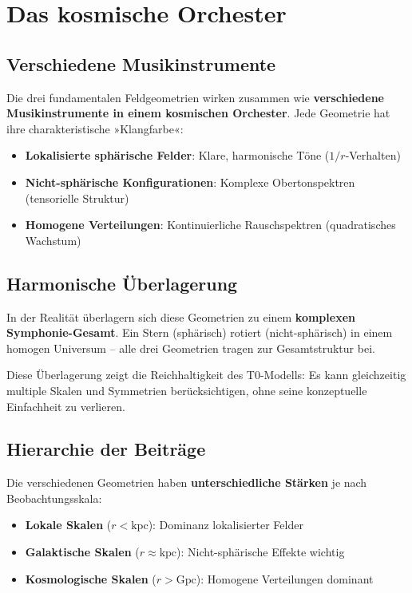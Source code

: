 \documentclass[12pt,a4paper]{report}
\begin{document}
	\section{Das kosmische Orchester}
	
	\subsection{Verschiedene Musikinstrumente}
	
	Die drei fundamentalen Feldgeometrien wirken zusammen wie \textbf{verschiedene Musikinstrumente in einem kosmischen Orchester}. Jede Geometrie hat ihre charakteristische »Klangfarbe«:
	
	\begin{itemize}
		\item \textbf{Lokalisierte sphärische Felder}: Klare, harmonische Töne ($1/r$-Verhalten)
		\item \textbf{Nicht-sphärische Konfigurationen}: Komplexe Obertonspektren (tensorielle Struktur)
		\item \textbf{Homogene Verteilungen}: Kontinuierliche Rauschspektren (quadratisches Wachstum)
	\end{itemize}
	
	\subsection{Harmonische Überlagerung}
	
	In der Realität überlagern sich diese Geometrien zu einem \textbf{komplexen Symphonie-Gesamt}. Ein Stern (sphärisch) rotiert (nicht-sphärisch) in einem homogen Universum -- alle drei Geometrien tragen zur Gesamtstruktur bei.
	
	Diese Überlagerung zeigt die Reichhaltigkeit des T0-Modells: Es kann gleichzeitig multiple Skalen und Symmetrien berücksichtigen, ohne seine konzeptuelle Einfachheit zu verlieren.
	
	\subsection{Hierarchie der Beiträge}
	
	Die verschiedenen Geometrien haben \textbf{unterschiedliche Stärken} je nach Beobachtungsskala:
	\begin{itemize}
		\item \textbf{Lokale Skalen} ($r < \text{kpc}$): Dominanz lokalisierter Felder
		\item \textbf{Galaktische Skalen} ($r \approx \text{kpc}$): Nicht-sphärische Effekte wichtig
		\item \textbf{Kosmologische Skalen} ($r > \text{Gpc}$): Homogene Verteilungen dominant
	\end{itemize}
	
\end{document}
